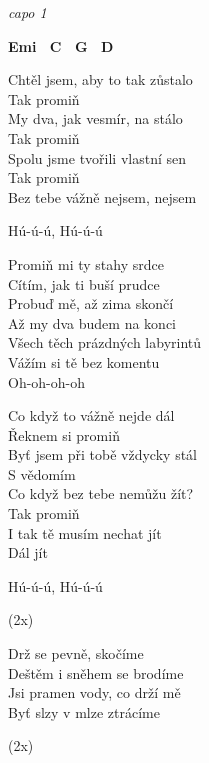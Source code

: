
\re{}
\textit{capo 1}
 
\re{}
\begin{footnotesize}
\textbf{Emi \ C \ G \ D}
\end{footnotesize}

\ve{}
Chtěl jsem, aby to tak zůstalo\\
Tak promiň\\
My dva, jak vesmír, na stálo\\
Tak promiň\\
Spolu jsme tvořili vlastní sen\\
Tak promiň\\
Bez tebe vážně nejsem, nejsem
 
Hú-ú-ú, Hú-ú-ú 

\cho{}
Promiň mi ty stahy srdce\\
Cítím, jak ti buší prudce\\
Probuď mě, až zima skončí\\
Až my dva budem na konci\\
Všech těch prázdných labyrintů\\
Vážím si tě bez komentu\\
Oh-oh-oh-oh 

\ve{}Co když to vážně nejde dál\\
Řeknem si promiň\\
Byť jsem při tobě vždycky stál\\
S vědomím\\
Co když bez tebe nemůžu žít?\\
Tak promiň\\
I tak tě musím nechat jít\\
Dál jít 

\re{}
Hú-ú-ú, Hú-ú-ú 

\cho{}
(2x)

\ve{}
Drž se pevně, skočíme\\
Deštěm i sněhem se brodíme\\
Jsi pramen vody, co drží mě\\
Byť slzy v mlze ztrácíme 

\cho{}
(2x)

\esong